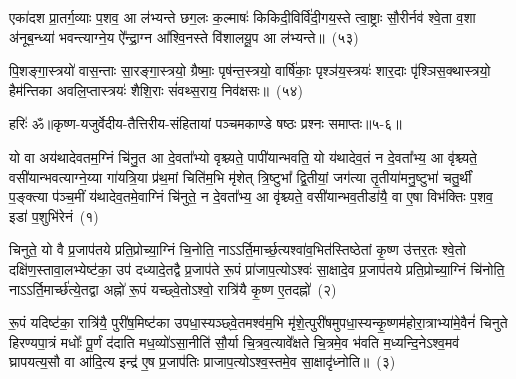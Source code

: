 {\anuvakamend[{सोमा॑य स्व॒राज्ञे॒ चतु॑स्त्रिꣳशत्}]}%

एका॑\-दश प्रा॒तर्ग॒व्याः प॒शव॒ आ ल॑भ्यन्ते छग॒लः क॒ल्माषः॑ किकिदी॒विर्वि॑दी॒गय॒स्ते त्वा॒ष्ट्राः सौ॒रीर्नव॑ श्वे॒ता व॒शा अ॑नूब॒न्ध्या॑ भवन्त्याग्ने॒य ऐ᳚न्द्रा॒ग्न आ᳚श्वि॒नस्ते वि॑शालयू॒प आ ल॑भ्यन्ते॥~(५३)\ip

{\anuvakamend[{एका॑\-दश॒ पञ्च॑विꣳशतिः}]}%

पि॒शङ्गा॒स्त्रयो॑ वास॒न्ताः सा॒रङ्गा॒स्त्रयो॒ ग्रैष्माः॒ पृष॑न्त॒स्त्रयो॒ वार्\mbox{}षि॑काः॒ पृश्ञ॑य॒स्त्रयः॑ शार॒दाः पृ॑श्ञिस॒क्थास्त्रयो॒ हैम॑न्तिका अवलि॒प्तास्त्रयः॑ शैशि॒राः सं॑वथ्स॒राय॒ निव॑क्षसः॥~(५४)\ip

{\anuvakamend[{पि॒शङ्गा॑ विꣳश॒तिः}]}%

{हरिः॑ ॐ}{॥कृष्ण-यजुर्वेदीय-तैत्तिरीय-संहितायां पञ्चमकाण्डे षष्ठः प्रश्नः समाप्तः॥५-६॥}



\setcounter{anuvakam}{0}
यो वा अय॑थादेवतम॒ग्निं चि॑नु॒त आ दे॒वता᳚भ्यो वृश्च्यते॒ पापी॑यान्भवति॒ यो य॑थादेव॒तं न दे॒वता᳚भ्य॒ आ वृ॑श्च्यते॒ वसी॑यान्भवत्याग्ने॒य्या गा॑यत्रि॒या प्र॑थ॒मां चिति॑म॒भि मृ॑शेत् त्रि॒ष्टुभा᳚ द्वि॒तीयां॒ जग॑त्या तृ॒तीया॑मनु॒ष्टुभा॑ चतु॒र्थीं प॒ङ्क्त्या प॑ञ्च॒मीं य॑थादेव॒तमे॒वाग्निं चि॑नुते॒ न दे॒वता᳚भ्य॒ आ वृ॑श्च्यते॒ वसी॑यान्भव॒तीडा॑यै॒ वा ए॒षा विभ॑क्तिः प॒शव॒ इडा॑ प॒शुभि॑रेनं~(१)\ip

चिनुते॒ यो वै प्र॒जा\-प॑तये प्रति॒प्रोच्या॒ग्निं चि॒नोति॒ नाऽऽर्ति॒मार्च्छ॒त्यश्वा॑व॒भित॑स्तिष्ठेतां कृ॒ष्ण उ॑त्तर॒तः श्वे॒तो दक्षि॑ण॒\-स्तावा॒लभ्येष्ट॑का॒ उप॑ दध्यादे॒तद्वै प्र॒जा\-प॑ते रू॒पं प्रा॑जाप॒त्यो\-ऽश्वः॑ सा॒क्षादे॒व प्र॒जा\-प॑तये प्रति॒प्रोच्या॒ग्निं चि॑नोति॒ नाऽऽर्ति॒मार्च्छ॑त्ये॒तद्वा अह्नो॑ रू॒पं यच्छ्वे॒तो\-ऽश्वो॒ रात्रि॑यै कृ॒ष्ण ए॒तदह्नो॑~(२)\ip

रू॒पं यदिष्ट॑का॒ रात्रि॑यै॒ पुरी॑ष॒मिष्ट॑का उपधा॒स्यञ्छ्वे॒तमश्व॑म॒भि मृ॑शे॒त्पुरी॑षमुपधा॒स्यन्कृ॒ष्ण\-म॑होरा॒त्राभ्या॑मे॒वैनं॑ चिनुते हिरण्यपा॒त्रं मधोः᳚ पू॒र्णं द॑दाति मध॒व्यो॑\-ऽसा॒नीति॑ सौ॒र्या चि॒त्रव॒त्यावे᳚क्षते चि॒त्रमे॒व भ॑वति म॒ध्यन्दि॒ने\-ऽश्व॒मव॑ घ्रापयत्य॒सौ वा आ॑दि॒त्य इन्द्र॑ ए॒ष प्र॒जा\-प॑तिः प्राजाप॒त्यो\-ऽश्व॒स्तमे॒व सा॒क्षादृ॑ध्नोति॥~(३)\ip

